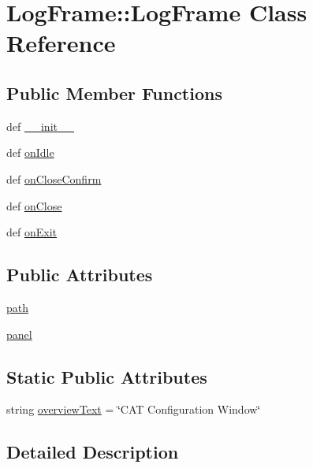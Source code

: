 \hypertarget{classLogFrame_1_1LogFrame}{
\section{LogFrame::LogFrame Class Reference}
\label{classLogFrame_1_1LogFrame}
}
\subsection*{Public Member Functions}
\begin{DoxyCompactItemize}
\item 
def \hyperlink{classLogFrame_1_1LogFrame_a0a15c587216b88be327898693793c55e}{\_\-\_\-init\_\-\_\-}
\item 
def \hyperlink{classLogFrame_1_1LogFrame_ad4fa2b05a213e2899ce5bdce7d02d23f}{onIdle}
\item 
def \hyperlink{classLogFrame_1_1LogFrame_ab0f6e78490bf48c51b61d44ac025ec6e}{onCloseConfirm}
\item 
def \hyperlink{classLogFrame_1_1LogFrame_aed95678395171c7b69755b8391c1bb74}{onClose}
\item 
def \hyperlink{classLogFrame_1_1LogFrame_a5db4211e2790c9f6f09e6c2cecc144b2}{onExit}
\end{DoxyCompactItemize}
\subsection*{Public Attributes}
\begin{DoxyCompactItemize}
\item 
\hyperlink{classLogFrame_1_1LogFrame_a944ed19f97020b9ce09b56a0b1f036d9}{path}
\item 
\hyperlink{classLogFrame_1_1LogFrame_a32d544d8fe1641e885737f9a0525be7f}{panel}
\end{DoxyCompactItemize}
\subsection*{Static Public Attributes}
\begin{DoxyCompactItemize}
\item 
string \hyperlink{classLogFrame_1_1LogFrame_a61a37e9b6e320a82c09e29a93bd6e210}{overviewText} = \char`\"{}CAT Configuration Window\char`\"{}
\end{DoxyCompactItemize}


\subsection{Detailed Description}


